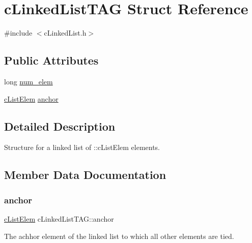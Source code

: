 \hypertarget{structc_linked_list_t_a_g}{}\section{c\+Linked\+List\+T\+AG Struct Reference}
\label{structc_linked_list_t_a_g}


{\ttfamily \#include $<$c\+Linked\+List.\+h$>$}

\subsection*{Public Attributes}
\begin{DoxyCompactItemize}
\item 
long \mbox{\hyperlink{structc_linked_list_t_a_g_a82fec83fe9a50a2b059d4f7323678547}{num\+\_\+elem}}
\item 
\mbox{\hyperlink{structc_list_elem_t_a_g}{c\+List\+Elem}} \mbox{\hyperlink{structc_linked_list_t_a_g_a100db7b17bf5691f6b812d87b3826f1e}{anchor}}
\end{DoxyCompactItemize}


\subsection{Detailed Description}
Structure for a linked list of \+::c\+List\+Elem elements. 

\subsection{Member Data Documentation}
\mbox{\label{structc_linked_list_t_a_g_a100db7b17bf5691f6b812d87b3826f1e}} 
\subsubsection{\texorpdfstring{anchor}{anchor}}
{\footnotesize\ttfamily \mbox{\hyperlink{structc_list_elem_t_a_g}{c\+List\+Elem}} c\+Linked\+List\+T\+A\+G\+::anchor}

The achhor element of the linked list to which all other elements are tied. \mbox{\label{structc_linked_list_t_a_g_a82fec83fe9a50a2b059d4f7323678547}} 
